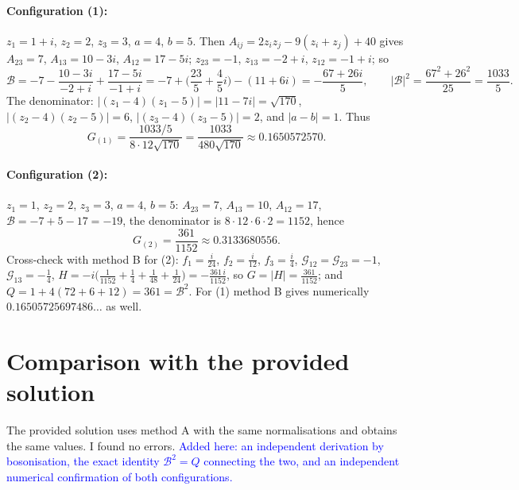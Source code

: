\documentclass[11pt]{article}
\newcommand{\chg}[1]{\textcolor{blue}{#1}}
\begin{document}
\paragraph{Configuration (1):} $z_1=1+i$, $z_2=2$, $z_3=3$, $a=4$, $b=5$. Then $A_{ij}=2z_iz_j-9(z_i+z_j)+40$ gives $A_{23}=7$, $A_{13}=10-3i$, $A_{12}=17-5i$; $z_{23}=-1$, $z_{13}=-2+i$, $z_{12}=-1+i$; so
\begin{equation}
\mathcal B=-7-\frac{10-3i}{-2+i}+\frac{17-5i}{-1+i}=-7+\Big(\frac{23}{5}+\frac45 i\Big)-(11+6i)=-\frac{67+26i}{5},\qquad |\mathcal B|^2=\frac{67^2+26^2}{25}=\frac{1033}{5}.
\end{equation}
The denominator: $|(z_1-4)(z_1-5)|=|11-7i|=\sqrt{170}$, $|(z_2-4)(z_2-5)|=6$, $|(z_3-4)(z_3-5)|=2$, and $|a-b|=1$. Thus
\begin{equation}
G_{(1)}=\frac{1033/5}{8\cdot12\sqrt{170}}=\frac{1033}{480\sqrt{170}}\approx0.1650572570 .
\end{equation}
\paragraph{Configuration (2):} $z_1=1$, $z_2=2$, $z_3=3$, $a=4$, $b=5$: $A_{23}=7$, $A_{13}=10$, $A_{12}=17$, $\mathcal B=-7+5-17=-19$, the denominator is $8\cdot12\cdot6\cdot2=1152$, hence
\begin{equation}
G_{(2)}=\frac{361}{1152}\approx0.3133680556 .
\end{equation}
Cross-check with method B for (2): $f_1=\frac{i}{24}$, $f_2=\frac{i}{12}$, $f_3=\frac{i}{4}$, $\mathcal G_{12}=\mathcal G_{23}=-1$, $\mathcal G_{13}=-\frac14$, $H=-i\big(\frac1{1152}+\frac14+\frac1{48}+\frac1{24}\big)=-\frac{361\,i}{1152}$, so $G=|H|=\frac{361}{1152}$; and $Q=1+4(72+6+12)=361=\mathcal B^2$. For (1) method B gives numerically $0.16505725697486\ldots$ as well.

\section{Comparison with the provided solution}
The provided solution uses method A with the same normalisations and obtains the same values. I found no errors. \chg{Added here: an independent derivation by bosonisation, the exact identity $\mathcal B^2=Q$ connecting the two, and an independent numerical confirmation of both configurations.}
\end{document}
